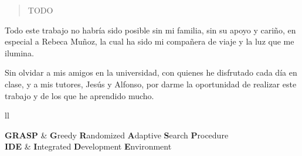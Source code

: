 \documentclass[
12pt, %
spanish, %
onehalfspacing, %
parskip, %
headsepline, %
openany %
]{MastersDoctoralThesis} %
\begin{document}

\begin{abstract}
\addchaptertocentry{\abstractname} %
TODO
\end{abstract}


\begin{acknowledgements}
\addchaptertocentry{\acknowledgementname} %
Todo este trabajo no habría sido posible sin mi familia, sin su apoyo y cariño, en especial a Rebeca Muñoz, la cual ha sido mi compañera de viaje y la luz que me ilumina.

Sin olvidar a mis amigos en la universidad, con quienes he disfrutado cada día en clase, y a mis tutores, Jesús y Alfonso, por darme la oportunidad de realizar este trabajo y de los que he aprendido mucho.
\end{acknowledgements}


\tableofcontents %

\listoffigures %

\listoftables %


\begin{abbreviations}{ll} %
	
\textbf{GRASP} & \textbf{G}reedy \textbf{R}andomized \textbf{A}daptive  \textbf{S}earch  \textbf{P}rocedure \\
\textbf{IDE} & \textbf{I}ntegrated \textbf{D}evelopment \textbf{E}nvironment \\

\end{abbreviations}
\end{document}
